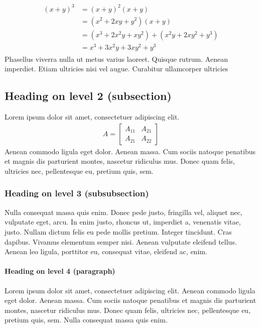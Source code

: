 \documentclass[paper=a4, fontsize=11pt]{scrartcl}
\numberwithin{equation}{section}		%
\numberwithin{figure}{section}			%
\numberwithin{table}{section}				%
\begin{document}
\begin{align} 
	\begin{split}
	(x+y)^3 	&= (x+y)^2(x+y)\\
					&=(x^2+2xy+y^2)(x+y)\\
					&=(x^3+2x^2y+xy^2) + (x^2y+2xy^2+y^3)\\
					&=x^3+3x^2y+3xy^2+y^3
	\end{split}					
\end{align}
Phasellus viverra nulla ut metus varius laoreet. Quisque rutrum. Aenean imperdiet. Etiam ultricies nisi vel augue. Curabitur ullamcorper ultricies 

\subsection{Heading on level 2 (subsection)}
Lorem ipsum dolor sit amet, consectetuer adipiscing elit. 
\begin{align}
	A = 
	\begin{bmatrix}
	A_{11} & A_{21} \\
  	A_{21} & A_{22}
	\end{bmatrix}
\end{align}
Aenean commodo ligula eget dolor. Aenean massa. Cum sociis natoque penatibus et magnis dis parturient montes, nascetur ridiculus mus. Donec quam felis, ultricies nec, pellentesque eu, pretium quis, sem.

\subsubsection{Heading on level 3 (subsubsection)}
Nulla consequat massa quis enim. Donec pede justo, fringilla vel, aliquet nec, vulputate eget, arcu. In enim justo, rhoncus ut, imperdiet a, venenatis vitae, justo. Nullam dictum felis eu pede mollis pretium. Integer tincidunt. Cras dapibus. Vivamus elementum semper nisi. Aenean vulputate eleifend tellus. Aenean leo ligula, porttitor eu, consequat vitae, eleifend ac, enim.

\paragraph{Heading on level 4 (paragraph)}
Lorem ipsum dolor sit amet, consectetuer adipiscing elit. Aenean commodo ligula eget dolor. Aenean massa. Cum sociis natoque penatibus et magnis dis parturient montes, nascetur ridiculus mus. Donec quam felis, ultricies nec, pellentesque eu, pretium quis, sem. Nulla consequat massa quis enim. 
\end{document}
